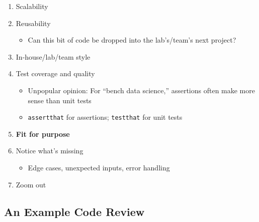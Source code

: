 \documentclass[
]{article}
\providecommand{\tightlist}{%
  \setlength{\itemsep}{0pt}\setlength{\parskip}{0pt}}
\begin{document}
\begin{enumerate}
  \begin{itemize}
  \tightlist
  \item
    What happens if packages aren't installed?

    \begin{itemize}
    \tightlist
    \item
      Reminder: \texttt{require()} doesn't stop if the package is missing
    \end{itemize}
  \item
    Data can't be found?
  \item
    Data has missing values or errors?
  \item
    Data has been altered or corrupted?
  \item
    A function returns a missing or zero-length value?
  \item
    One script in the middle of the pipeline is altered?
  \end{itemize}
\item
  Scalability
\item
  Reusability

  \begin{itemize}
  \tightlist
  \item
    Can this bit of code be dropped into the lab's/team's next project?
  \end{itemize}
\item
  In-house/lab/team style
\item
  Test coverage and quality

  \begin{itemize}
  \tightlist
  \item
    Unpopular opinion: For ``bench data science,'' assertions often make more sense than unit tests
  \item
    \texttt{assertthat} for assertions; \texttt{testthat} for unit tests
  \end{itemize}
\item
  \textbf{Fit for purpose}
\item
  Notice what's missing

  \begin{itemize}
  \tightlist
  \item
    Edge cases, unexpected inputs, error handling
  \end{itemize}
\item
  Zoom out
\end{enumerate}

\hypertarget{an-example-code-review}{%
\subsection{An Example Code Review}\label{an-example-code-review}}
\end{document}

